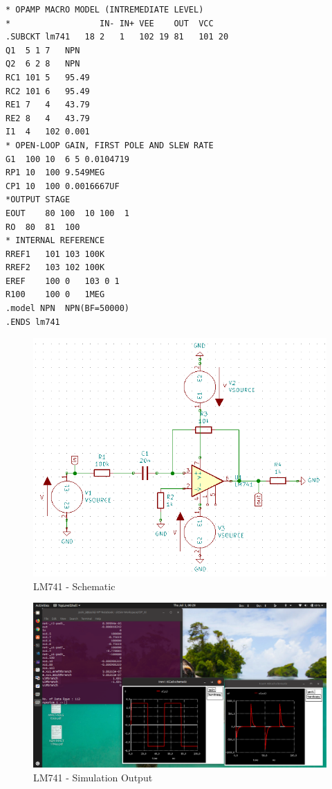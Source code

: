 \documentclass[12pt,a4paper]{report}
\begin{document}
\begin{verbatim}
* OPAMP MACRO MODEL (INTREMEDIATE LEVEL)
*                  IN- IN+ VEE    OUT  VCC
.SUBCKT lm741   18 2   1   102 19 81   101 20
Q1	5 1	7	NPN
Q2	6 2	8	NPN
RC1	101	5	95.49
RC2	101	6	95.49
RE1	7	4	43.79
RE2	8	4	43.79
I1	4	102	0.001
* OPEN-LOOP GAIN, FIRST POLE AND SLEW RATE
G1	100 10	6 5 0.0104719
RP1	10	100	9.549MEG
CP1	10	100	0.0016667UF
*OUTPUT STAGE
EOUT	80 100	10 100	1
RO	80	81	100
* INTERNAL REFERENCE
RREF1	101	103	100K
RREF2	103	102	100K
EREF	100 0	103 0 1
R100	100	0	1MEG
.model NPN  NPN(BF=50000)
.ENDS lm741
\end{verbatim}
\vspace{5mm}
\begin{figure}[h]
	\centering
	\includegraphics[scale=0.4]{lm741_sch}
	\caption{LM741 - Schematic}
\end{figure}

\vspace{5mm}
\begin{figure}[h]
	\centering
	\includegraphics[width=\textwidth]{lm741_sim}
	\caption{LM741 - Simulation Output}
\end{figure}
\end{document}
